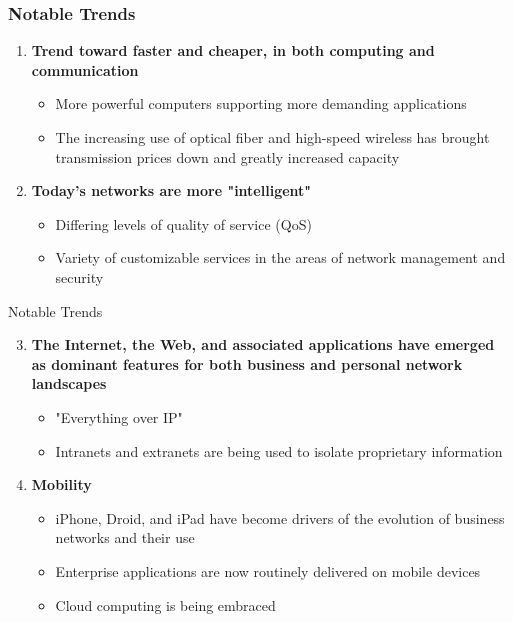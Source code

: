 \documentclass[pdflatex,compress]{beamer}
\begin{document}
\begin{frame}
	\frametitle{Notable Trends}
	\begin{enumerate}
		\item \textbf{Trend toward faster and cheaper, in both computing and communication}
		\begin{itemize}
			\item More powerful computers supporting more demanding applications
			\item The increasing use of optical fiber and high-speed wireless has brought transmission prices down and greatly increased capacity
		\end{itemize}
		\item \textbf{Today's networks are more "intelligent"}
		\begin{itemize}
			\item Differing levels of quality of service (QoS)
			\item Variety of customizable services in the areas of network management and security
		\end{itemize}
	\end{enumerate}
\end{frame}

\begin{frame}{Notable Trends}
	\begin{enumerate}
		\setcounter{enumi}{2}
		\item \textbf{The Internet, the Web, and associated applications have emerged as dominant features for both business and personal network landscapes}
		\begin{itemize}
			\item "Everything over IP"
			\item Intranets and extranets are being used to isolate proprietary information
		\end{itemize}
		\item \textbf{Mobility}
		\begin{itemize}
			\item iPhone, Droid, and iPad have become drivers of the evolution of business networks and their use
			\item Enterprise applications are now routinely delivered on mobile devices
			\item Cloud computing is being embraced
		\end{itemize}
	\end{enumerate}
\end{frame}
\end{document}
